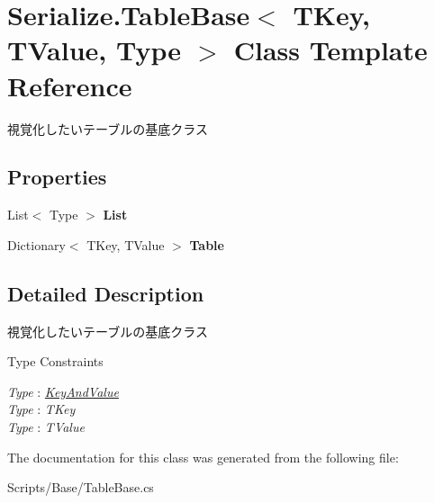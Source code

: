 \hypertarget{class_serialize_1_1_table_base}{}\section{Serialize.\+Table\+Base$<$ T\+Key, T\+Value, Type $>$ Class Template Reference}
\label{class_serialize_1_1_table_base}


視覚化したいテーブルの基底クラス  


\subsection*{Properties}
\begin{DoxyCompactItemize}
\item 
List$<$ Type $>$ {\bfseries List}\hypertarget{class_serialize_1_1_table_base_a75f03668ff5a08d4da75d82e35ba1fbc}{}\label{class_serialize_1_1_table_base_a75f03668ff5a08d4da75d82e35ba1fbc}

\item 
Dictionary$<$ T\+Key, T\+Value $>$ {\bfseries Table}\hypertarget{class_serialize_1_1_table_base_a9b385d4e1d008c2e256f5ac57f642a95}{}\label{class_serialize_1_1_table_base_a9b385d4e1d008c2e256f5ac57f642a95}

\end{DoxyCompactItemize}


\subsection{Detailed Description}
視覚化したいテーブルの基底クラス 

\begin{Desc}
\item[Type Constraints]\begin{description}
\item[{\em Type} : {\em \hyperlink{class_serialize_1_1_key_and_value}{Key\+And\+Value}}]\item[{\em Type} : {\em T\+Key}]\item[{\em Type} : {\em T\+Value}]\end{description}
\end{Desc}


The documentation for this class was generated from the following file\+:\begin{DoxyCompactItemize}
\item 
Scripts/\+Base/Table\+Base.\+cs\end{DoxyCompactItemize}
